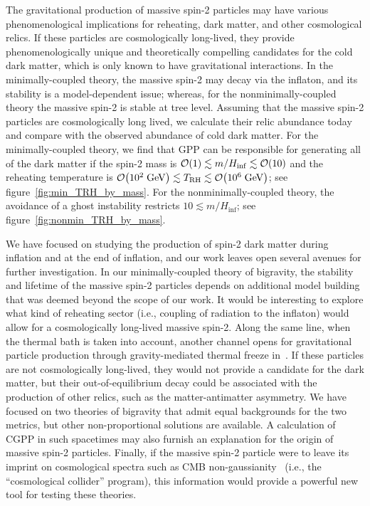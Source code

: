 \documentclass[11pt,a4paper]{article}
\newcommand{\GeV}{{\; \mathrm{GeV}}}
\newcommand{\fref}[1]{figure~\ref{#1}}
\begin{document}
The gravitational production of massive spin-2 particles may have various phenomenological implications for reheating, dark matter, and other cosmological relics.  If these particles are cosmologically long-lived, they provide phenomenologically unique and theoretically compelling candidates for the cold dark matter, which is only known to have gravitational interactions.  In the minimally-coupled theory, the massive spin-2 may decay via the inflaton, and its stability is a model-dependent issue; whereas, for the nonminimally-coupled theory the massive spin-2 is stable at tree level.  Assuming that the massive spin-2 particles are cosmologically long lived, we calculate their relic abundance today and compare with the observed abundance of cold dark matter.  For the minimally-coupled theory, we find that GPP can be responsible for generating all of the dark matter if the spin-2 mass is $\order{1} \lesssim m / H_\mathrm{inf} \lesssim \order{10}$ and the reheating temperature is $\order{10^{2} \GeV} \lesssim T_\mathrm{RH} \lesssim \order{10^6 \GeV}$; see \fref{fig:min_TRH_by_mass}.  For the nonminimally-coupled theory, the avoidance of a ghost instability restricts $10 \lesssim m/H_\mathrm{inf}$; see \fref{fig:nonmin_TRH_by_mass}.  

We have focused on studying the production of spin-2 dark matter during inflation and at the end of inflation, and our work leaves open several avenues for further investigation.  In our minimally-coupled theory of bigravity, the stability and lifetime of the massive spin-2 particles depends on additional model building that was deemed beyond the scope of our work.  It would be interesting to explore what kind of reheating sector (i.e., coupling of radiation to the inflaton) would allow for a cosmologically long-lived massive spin-2.  Along the same line, when the thermal bath is taken into account, another channel opens for gravitational particle production through gravity-mediated thermal freeze in~\cite{Garny:2015sjg,Bernal:2018qlk}.  If these particles are not cosmologically long-lived, they would not provide a candidate for the dark matter, but their out-of-equilibrium decay could be associated with the production of other relics, such as the matter-antimatter asymmetry.  We have focused on two theories of bigravity that admit equal backgrounds for the two metrics, but other non-proportional solutions are available. A calculation of CGPP in such spacetimes may also furnish an explanation for the origin of massive spin-2 particles.  Finally, if the massive spin-2 particle were to leave its imprint on cosmological spectra such as CMB non-gaussianity~\cite{Dimastrogiovanni:2018uqy} (i.e., the ``cosmological collider'' program), this information would provide a powerful new tool for testing these theories.  
\end{document}
